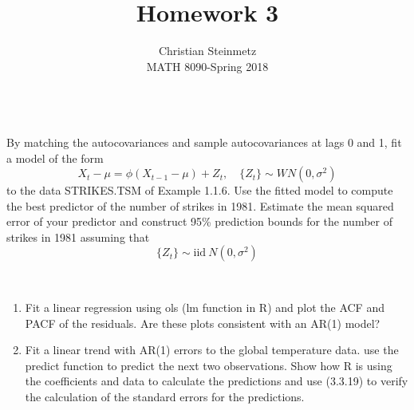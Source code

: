 \documentclass[12pt]{article}
\newenvironment{solution}[2][Solution]{\begin{trivlist}
	\item[\hskip \labelsep {\bfseries #1}]}{\end{trivlist}}
\newenvironment{problem}[2][Problem]{\begin{trivlist}
	\item[\hskip \labelsep {\bfseries #1}\hskip \labelsep {\bfseries #2.}]}{\end{trivlist}}
\begin{document}
	 
	 
	\title{Homework 3}%
	\author{Christian Steinmetz\\ %
	MATH 8090-Spring 2018} %
	 
	\maketitle
	
	\begin{problem}{6}
	$ $ \\
	By matching the autocovariances and sample autocovariances at lags 0 and 1,
	fit a model of the form
	\begin{equation*}
		X_t - \mu = \phi(X_{t-1} - \mu) + Z_t,  \quad \{{Z_t}\} \sim WN(0, \sigma^2)
	\end{equation*}
	to the data STRIKES.TSM of Example 1.1.6. Use the fitted model to compute
	the best predictor of the number of strikes in 1981. Estimate the mean squared
	error of your predictor and construct 95\% prediction bounds for the number of
	strikes in 1981 assuming that
	\begin{equation*}
	\{{Z_t}\} \sim \text{iid} \ N(0, \sigma^2)
	\end{equation*}
	
	\end{problem}
	
	\begin{solution}{}
		
	\end{solution}
	\pagebreak
	
	\begin{problem}{7}
	$ $
	\begin{enumerate}[label=(\alph*)]
		\item Fit a linear regression using ols (lm function in R) and plot the ACF and PACF of the residuals. Are these plots consistent with an AR(1) model?
		\item Fit a linear trend with AR(1) errors to the global temperature data. use the predict function to predict the next two observations. Show how R is using the coefficients and data to calculate the predictions and use (3.3.19) to verify the calculation of the standard errors for the predictions. 
	\end{enumerate}
	\end{problem}
		
\end{document}
